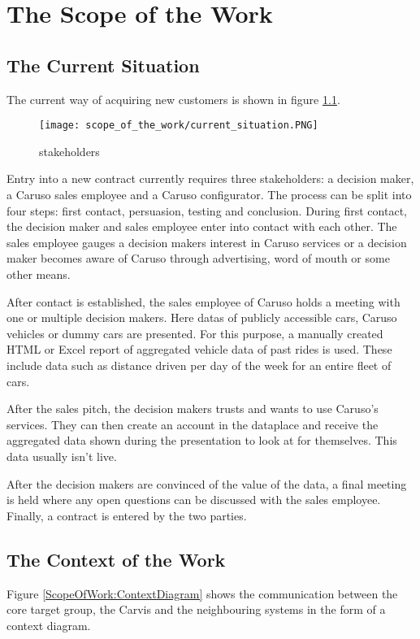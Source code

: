 \chapter{The Scope of the Work}
\section{The Current Situation}
The current way of acquiring new customers is shown in figure \ref{ScopeOfWork:Situation}.
\begin{figure}[ht]
  \centering
  \texttt{[image: scope\_of\_the\_work/current\_situation.PNG]}
  \caption{\Glspl{stakeholder}}
  \label{ScopeOfWork:Situation}
\end{figure}

Entry into a new contract currently requires three \glspl{stakeholder}: a decision maker, a Caruso sales employee and a Caruso configurator. The process can be split into four steps: first contact, persuasion, testing and conclusion. During first contact, the decision maker and sales employee enter into contact with each other. The sales employee gauges a decision makers interest in Caruso services or a decision maker becomes aware of Caruso through advertising, word of mouth or some other means.

After contact is established, the sales employee of Caruso holds a meeting with one or multiple decision makers. Here \glspl{data} of publicly accessible cars, Caruso vehicles or dummy cars are presented. For this purpose, a manually created HTML or Excel report of aggregated vehicle data of past rides is used. These include data such as distance driven per day of the week for an entire fleet of cars.

After the sales pitch, the decision makers trusts and wants to use Caruso's services. They can then create an account in the \gls{dataplace} and receive the aggregated data shown during the presentation to look at for themselves. This data usually isn't live.

After the decision makers are convinced of the value of the data, a final meeting is held where any open questions can be discussed with the sales employee. Finally, a contract is entered by the two parties.

\section{The Context of the Work}
Figure \ref*{ScopeOfWork:ContextDiagram} shows the communication between the core target group, the Carvis and the neighbouring systems in the form of a context diagram.

